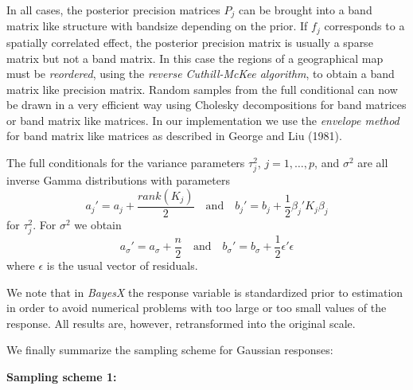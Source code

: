 \documentclass[11pt,a4paper,twoside]{bayesxarticle}
\begin{document}
In all cases, the posterior precision matrices $P_j$ can be
brought into a band matrix like structure with bandsize depending
on the prior. If $f_j$ corresponds to a spatially correlated
effect, the posterior precision matrix is usually a sparse matrix
but not a band matrix. In this case the regions of a geographical
map must be {\em reordered}, using the {\em reverse Cuthill-McKee
algorithm}, to obtain a band matrix like precision matrix. Random
samples from the full conditional can now be drawn in a very
efficient way using Cholesky decompositions for band matrices or
band matrix like matrices. In our implementation we use the {\em
envelope method} for band matrix like matrices as described in
George and Liu (1981).

The full conditionals for the variance parameters $\tau^2_j$,
$j=1,\dots,p$, and $\sigma^2$ are all inverse Gamma distributions
with parameters
\begin{equation}
\label{hypab} a_j' = a_j + \frac{rank(K_j)}{2} \quad \mbox{and}
\quad b_j' = b_j + \frac{1}{2} \beta_j'K_j \beta_j
\end{equation}
for $\tau^2_j$. For $\sigma^2$ we obtain
\begin{equation}
\label{hypabsigma} a_{\sigma}' = a_{\sigma}+\frac{n}{2} \quad
\mbox{and} \quad b_{\sigma}' = b_{\sigma} + \frac{1}{2}
\epsilon'\epsilon
\end{equation}
where $\epsilon$ is the usual vector of residuals.

We note that in {\em BayesX} the response variable is standardized
prior to estimation in order to avoid numerical problems with too
large or too small values of the response. All results are,
however, retransformed into the original scale.

We finally summarize the sampling scheme for Gaussian responses:

{\bf Sampling scheme 1:}
\end{document}
